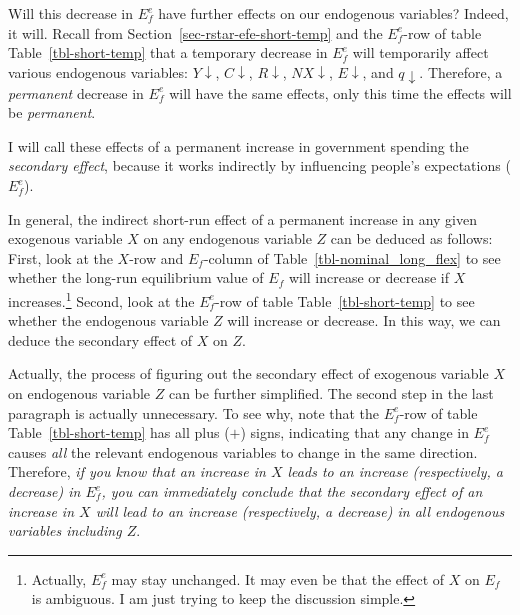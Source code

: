 \documentclass[
  letterpaper,
]{book}
\theoremstyle{plain}
\theoremstyle{remark}
\begin{document}
Will this decrease in \(E_f^e\) have further effects on our endogenous
variables? Indeed, it will. Recall from
Section~\ref{sec-rstar-efe-short-temp} and the \(E_f^e\)-row of table
Table~\ref{tbl-short-temp} that a temporary decrease in \(E_f^e\) will
temporarily affect various endogenous variables: \(Y\downarrow\),
\(C\downarrow\), \(R\downarrow\), \(NX\downarrow\), \(E\downarrow\), and
\(q\downarrow\). Therefore, a \emph{permanent} decrease in \(E_f^e\)
will have the same effects, only this time the effects will be
\emph{permanent}.

I will call these effects of a permanent increase in government spending
the \emph{secondary effect}, because it works indirectly by influencing
people's expectations (\(E_f^e\)).

In general, the indirect short-run effect of a permanent increase in any
given exogenous variable \(X\) on any endogenous variable \(Z\) can be
deduced as follows: First, look at the \(X\)-row and \(E_f\)-column of
Table~\ref{tbl-nominal_long_flex} to see whether the long-run
equilibrium value of \(E_f\) will increase or decrease if \(X\)
increases.\footnote{Actually, \(E_f^e\) may stay unchanged. It may even
  be that the effect of \(X\) on \(E_f\) is ambiguous. I am just trying
  to keep the discussion simple.} Second, look at the \(E_f^e\)-row of
table Table~\ref{tbl-short-temp} to see whether the endogenous variable
\(Z\) will increase or decrease. In this way, we can deduce the
secondary effect of \(X\) on \(Z\).

Actually, the process of figuring out the secondary effect of exogenous
variable \(X\) on endogenous variable \(Z\) can be further simplified.
The second step in the last paragraph is actually unnecessary. To see
why, note that the \(E_f^e\)-row of table Table~\ref{tbl-short-temp} has
all plus (\(+\)) signs, indicating that any change in \(E_f^e\) causes
\emph{all} the relevant endogenous variables to change in the same
direction. Therefore, \emph{if you know that an increase in \(X\) leads
to an increase (respectively, a decrease) in \(E_f^e\), you can
immediately conclude that the secondary effect of an increase in \(X\)
will lead to an increase (respectively, a decrease) in all endogenous
variables including \(Z\)}.
\end{document}
